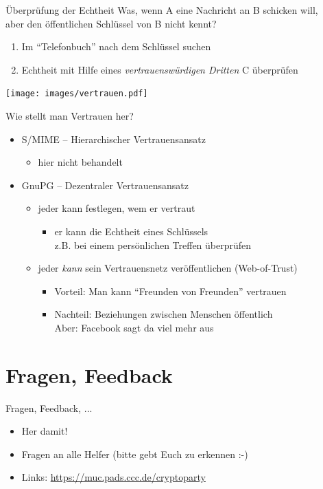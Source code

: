   \begin{frame}{Überprüfung der Echtheit}
  Was, wenn A eine Nachricht an B schicken will,\\ aber den öffentlichen Schlüssel von B nicht kennt?\\
  \begin{enumerate}
    \item Im ``Telefonbuch'' nach dem Schlüssel suchen
    \item Echtheit mit Hilfe eines \emph{vertrauenswürdigen Dritten} C überprüfen
  \end{enumerate}
  \begin{center}
    \texttt{[image: images/vertrauen.pdf]}
  \end{center}
  \end{frame}

  \begin{frame}{Wie stellt man Vertrauen her?}
    \begin{itemize}
      \item S/MIME -- Hierarchischer Vertrauensansatz
      \begin{itemize}
        \item hier nicht behandelt
      \end{itemize}
      \item GnuPG -- Dezentraler Vertrauensansatz
      \begin{itemize}
        \item jeder kann festlegen, wem er vertraut
        \begin{itemize}
          \item er kann die Echtheit eines Schlüssels\\ z.B. bei einem persönlichen Treffen überprüfen
        \end{itemize}
        \item jeder \emph{kann} sein Vertrauensnetz veröffentlichen (Web-of-Trust)
        \begin{itemize}
          \item Vorteil: Man kann ``Freunden von Freunden'' vertrauen
          \item Nachteil: Beziehungen zwischen Menschen öffentlich\\ Aber: Facebook sagt da viel mehr aus
        \end{itemize}
      \end{itemize}
    \end{itemize}
  \end{frame}

\section{Fragen, Feedback}
  \begin{frame}{Fragen, Feedback, ...}
    \begin{itemize}
      \item{Her damit!}
      \item{Fragen an alle Helfer (bitte gebt Euch zu erkennen :-)}
      \item{Links: \url{https://muc.pads.ccc.de/cryptoparty}}
    \end{itemize}
  \end{frame}

